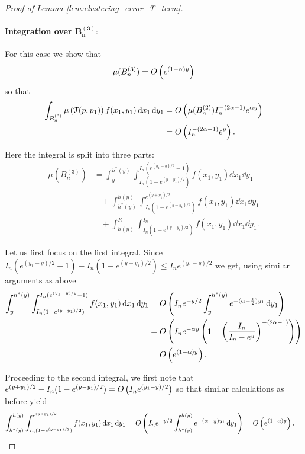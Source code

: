 \begin{proof}[Proof of Lemma \ref{lem:clustering_error_T_term}]
\paragraph{Integration over $\bm{B_n^{(3)}}:$}

For this case we show that 
\begin{equation}\label{eq:mu_triangle_diff_3}
	\mu(B_n^{(3)}) = O\left(e^{(1-\alpha)y}\right)
\end{equation} 
so that
\begin{align*}
	\int_{B_n^{(3)}} \mu\left(\mathcal{T}(p,p_1)\right) 
		f(x_1,y_1)	\operatorname{\mathrm{d}\hspace{-2pt}} x_1 \operatorname{\mathrm{d}\hspace{-2pt}} y_1
	&= O\left(\mu(B_n^{(2)}) I_n^{-(2\alpha - 1)} e^{\alpha y}\right)\\
	&= O\left(I_n^{-(2\alpha-1)} e^{y}\right).
\end{align*}

Here the integral is split into three parts:
\begin{align*}
	\mu(B_n^{(3)}) &= \int_y^{h^\ast(y)} \int_{I_n(1-e^{(y-y_1)/2})}^{I_n(e^{(y_1-y)/2}-1)}
		f(x_1,y_1) \dd x_1 \dd y_1\\
	&\hspace{10pt}+ \int_{h^\ast(y)}^{h(y)} \int_{I_n(1-e^{(y-y_1)/2})}^{e^{(y+y_1)/2}}
		f(x_1,y_1) \dd x_1 \dd y_1\\
	&\hspace{10pt}+ \int_{h(y)}^{R} \int_{I_n(1-e^{(y-y_1)/2})}^{I_n}
		f(x_1,y_1) \dd x_1 \dd y_1.
\end{align*}

Let us first focus on the first integral. Since	$I_n(e^{(y_1-y)/2}-1) - I_n(1-e^{(y-y_1)/2}) \le I_n e^{(y_1-y)/2}$ we get,
using similar arguments as above
\begin{align*}
	\int_y^{h^\ast(y)} \int_{I_n(1-e^{(y-y_1)/2})}^{I_n(e^{(y_1-y)/2}-1)} f(x_1,y_1) \operatorname{\mathrm{d}\hspace{-2pt}} x_1 \operatorname{\mathrm{d}\hspace{-2pt}} y_1
	&= O\left(I_n e^{-y/2} \int_y^{h^\ast(y)} e^{-(\alpha - \frac{1}{2})y_1} \operatorname{\mathrm{d}\hspace{-2pt}} y_1\right)\\
	&= O\left(I_n e^{-\alpha y} \left(1 - \left(\frac{I_n}{I_n - e^y}\right)^{-(2\alpha - 1)}\right)\right)\\
	&= O\left(e^{(1-\alpha)y}\right).
\end{align*}

Proceeding to the second integral, we first note that $e^{(y+y_1)/2} - I_n(1-e^{(y-y_1)/2}) = O\left(I_n e^{(y_1-y)/2}\right)$ so that similar calculations as before yield
\begin{align*}
	\int_{h^\ast(y)}^{h(y)} \int_{I_n(1-e^{(y-y_1)/2})}^{e^{(y+y_1)/2}}	f(x_1,y_1) \operatorname{\mathrm{d}\hspace{-2pt}} x_1 \operatorname{\mathrm{d}\hspace{-2pt}} y_1
	&= O\left(I_n e^{-y/2} \int_{h^\ast(y)}^{h(y)} e^{-(\alpha - \frac{1}{2})y_1} \operatorname{\mathrm{d}\hspace{-2pt}} y_1\right)
		= O\left(e^{(1-\alpha)y}\right).
\end{align*}



\end{proof}